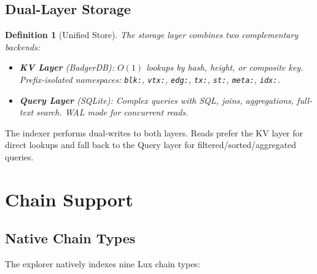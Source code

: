 \documentclass[11pt,a4paper]{article}
\newtheorem{definition}{Definition}[section]
\begin{document}
\subsection{Dual-Layer Storage}

\begin{definition}[Unified Store]
The storage layer combines two complementary backends:
\begin{itemize}
  \item \textbf{KV Layer} (BadgerDB): $O(1)$ lookups by hash, height, or composite key.
        Prefix-isolated namespaces: \texttt{blk:}, \texttt{vtx:}, \texttt{edg:}, \texttt{tx:},
        \texttt{st:}, \texttt{meta:}, \texttt{idx:}.
  \item \textbf{Query Layer} (SQLite): Complex queries with SQL, joins, aggregations,
        full-text search. WAL mode for concurrent reads.
\end{itemize}
\end{definition}

The indexer performs dual-writes to both layers. Reads prefer the KV layer for direct
lookups and fall back to the Query layer for filtered/sorted/aggregated queries.

\section{Chain Support}

\subsection{Native Chain Types}

The explorer natively indexes nine Lux chain types:
\end{document}
